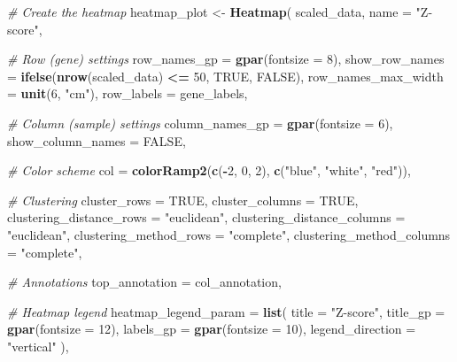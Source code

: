 \documentclass[
]{article}
\newenvironment{Shaded}{\begin{snugshade}}{\end{snugshade}}
\newcommand{\AttributeTok}[1]{\textcolor[rgb]{0.13,0.29,0.53}{#1}}
\newcommand{\CommentTok}[1]{\textcolor[rgb]{0.56,0.35,0.01}{\textit{#1}}}
\newcommand{\ConstantTok}[1]{\textcolor[rgb]{0.56,0.35,0.01}{#1}}
\newcommand{\DecValTok}[1]{\textcolor[rgb]{0.00,0.00,0.81}{#1}}
\newcommand{\FunctionTok}[1]{\textcolor[rgb]{0.13,0.29,0.53}{\textbf{#1}}}
\newcommand{\NormalTok}[1]{#1}
\newcommand{\OtherTok}[1]{\textcolor[rgb]{0.56,0.35,0.01}{#1}}
\newcommand{\SpecialCharTok}[1]{\textcolor[rgb]{0.81,0.36,0.00}{\textbf{#1}}}
\newcommand{\StringTok}[1]{\textcolor[rgb]{0.31,0.60,0.02}{#1}}
\begin{document}
\begin{Shaded}
\begin{Highlighting}[]
\CommentTok{\# Create the heatmap}
\NormalTok{heatmap\_plot }\OtherTok{\textless{}{-}} \FunctionTok{Heatmap}\NormalTok{(}
\NormalTok{  scaled\_data,}
  \AttributeTok{name =} \StringTok{"Z{-}score"}\NormalTok{,}
  
  \CommentTok{\# Row (gene) settings}
  \AttributeTok{row\_names\_gp =} \FunctionTok{gpar}\NormalTok{(}\AttributeTok{fontsize =} \DecValTok{8}\NormalTok{),}
  \AttributeTok{show\_row\_names =} \FunctionTok{ifelse}\NormalTok{(}\FunctionTok{nrow}\NormalTok{(scaled\_data) }\SpecialCharTok{\textless{}=} \DecValTok{50}\NormalTok{, }\ConstantTok{TRUE}\NormalTok{, }\ConstantTok{FALSE}\NormalTok{),}
  \AttributeTok{row\_names\_max\_width =} \FunctionTok{unit}\NormalTok{(}\DecValTok{6}\NormalTok{, }\StringTok{"cm"}\NormalTok{),}
  \AttributeTok{row\_labels =}\NormalTok{ gene\_labels,}
  
  \CommentTok{\# Column (sample) settings}
  \AttributeTok{column\_names\_gp =} \FunctionTok{gpar}\NormalTok{(}\AttributeTok{fontsize =} \DecValTok{6}\NormalTok{),}
  \AttributeTok{show\_column\_names =} \ConstantTok{FALSE}\NormalTok{,}
  
  \CommentTok{\# Color scheme}
  \AttributeTok{col =} \FunctionTok{colorRamp2}\NormalTok{(}\FunctionTok{c}\NormalTok{(}\SpecialCharTok{{-}}\DecValTok{2}\NormalTok{, }\DecValTok{0}\NormalTok{, }\DecValTok{2}\NormalTok{), }\FunctionTok{c}\NormalTok{(}\StringTok{"blue"}\NormalTok{, }\StringTok{"white"}\NormalTok{, }\StringTok{"red"}\NormalTok{)),}
  
  \CommentTok{\# Clustering}
  \AttributeTok{cluster\_rows =} \ConstantTok{TRUE}\NormalTok{,}
  \AttributeTok{cluster\_columns =} \ConstantTok{TRUE}\NormalTok{,}
  \AttributeTok{clustering\_distance\_rows =} \StringTok{"euclidean"}\NormalTok{,}
  \AttributeTok{clustering\_distance\_columns =} \StringTok{"euclidean"}\NormalTok{,}
  \AttributeTok{clustering\_method\_rows =} \StringTok{"complete"}\NormalTok{,}
  \AttributeTok{clustering\_method\_columns =} \StringTok{"complete"}\NormalTok{,}
  
  \CommentTok{\# Annotations}
  \AttributeTok{top\_annotation =}\NormalTok{ col\_annotation,}
  
  \CommentTok{\# Heatmap legend}
  \AttributeTok{heatmap\_legend\_param =} \FunctionTok{list}\NormalTok{(}
    \AttributeTok{title =} \StringTok{"Z{-}score"}\NormalTok{,}
    \AttributeTok{title\_gp =} \FunctionTok{gpar}\NormalTok{(}\AttributeTok{fontsize =} \DecValTok{12}\NormalTok{),}
    \AttributeTok{labels\_gp =} \FunctionTok{gpar}\NormalTok{(}\AttributeTok{fontsize =} \DecValTok{10}\NormalTok{),}
    \AttributeTok{legend\_direction =} \StringTok{"vertical"}
\NormalTok{  ),}
  

\end{Highlighting}
\end{Shaded}
\end{document}

